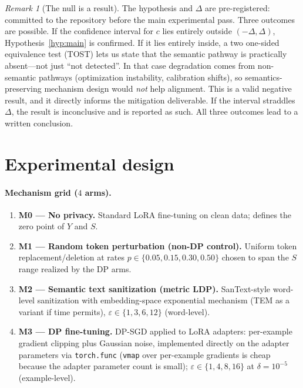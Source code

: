\documentclass{article}
\theoremstyle{definition}
\theoremstyle{plain}
\theoremstyle{remark}
\newtheorem{remark}{Remark}[section]
\newcommand{\eps}{\varepsilon}
\newcommand{\Sdist}{S}
\newcommand{\seclabel}[1]{\label{sec:#1}}
\begin{document}
\begin{remark}[The null is a result]\label{rem:null}
The hypothesis and $\Delta$ are pre-registered: committed to the repository
before the main experimental pass. Three outcomes are possible. If the
confidence interval for $c$ lies entirely outside $(-\Delta, \Delta)$,
Hypothesis~\ref{hyp:main} is confirmed. If it lies entirely inside, a two
one-sided equivalence test (TOST) lets us state that the semantic pathway is
practically absent---not just ``not detected''. In that case degradation
comes from non-semantic pathways (optimization instability, calibration
shifts), so semantics-preserving mechanism design would \emph{not} help
alignment. This is a valid negative result, and it directly informs the
mitigation deliverable. If the interval straddles $\Delta$, the result is
inconclusive and is reported as such. All three outcomes lead to a written
conclusion.
\end{remark}

\section{Experimental design}\seclabel{design}
\paragraph{Mechanism grid ($4$ arms).}
\begin{enumerate}[left=0pt,itemsep=1pt,topsep=1pt]
 \item \textbf{M0 --- No privacy.} Standard LoRA
 fine-tuning on clean data; defines the zero point of $Y$ and $\Sdist$.
 \item \textbf{M1 --- Random token perturbation (non-DP control).} Uniform
 token replacement/deletion at rates
 $p \in \{0.05, 0.15, 0.30, 0.50\}$ chosen to span the $\Sdist$ range
 realized by the DP arms.
 \item \textbf{M2 --- Semantic text sanitization (metric LDP).}
 SanText-style word-level sanitization with
 embedding-space exponential mechanism (TEM as a
 variant if time permits), $\eps \in \{1, 3, 6, 12\}$ (word-level).
 \item \textbf{M3 --- DP fine-tuning.} DP-SGD applied to LoRA adapters:
 per-example gradient clipping plus Gaussian noise, implemented directly
 on the adapter parameters via \texttt{torch.func} (\texttt{vmap} over
 per-example gradients is cheap because the adapter parameter count is
 small); $\eps \in \{1, 4, 8, 16\}$ at $\delta = 10^{-5}$
 (example-level).
\end{enumerate}
\end{document}
